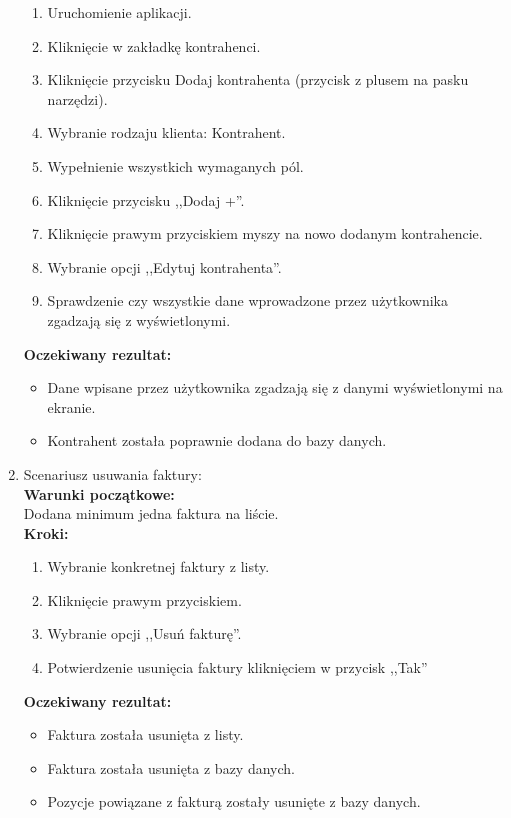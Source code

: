 \begin{enumerate}
        \begin{enumerate}
            \item Uruchomienie aplikacji.
            \item Kliknięcie w zakładkę kontrahenci.
            \item Kliknięcie przycisku Dodaj kontrahenta (przycisk z plusem na pasku narzędzi).
            \item Wybranie rodzaju klienta: Kontrahent.
            \item Wypełnienie wszystkich wymaganych pól.
            \item Kliknięcie przycisku ,,Dodaj +''.
            \item Kliknięcie prawym przyciskiem myszy na nowo dodanym kontrahencie.
            \item Wybranie opcji ,,Edytuj kontrahenta''.
            \item Sprawdzenie czy wszystkie dane wprowadzone przez użytkownika zgadzają się z wyświetlonymi.
        \end{enumerate}
        \textbf{Oczekiwany rezultat:}
        \begin{itemize}
            \item Dane wpisane przez użytkownika zgadzają się z danymi wyświetlonymi na ekranie.
            \item Kontrahent została poprawnie dodana do bazy danych.
        \end{itemize}
    \item Scenariusz usuwania faktury: \\
        \textbf{Warunki początkowe: } \\
        Dodana minimum jedna faktura na liście.\\
        \textbf{Kroki: }
        \begin{enumerate}
            \item Wybranie konkretnej faktury z listy.
            \item Kliknięcie prawym przyciskiem.
            \item Wybranie opcji ,,Usuń fakturę''.
            \item Potwierdzenie usunięcia faktury kliknięciem w przycisk ,,Tak''
        \end{enumerate}
        \textbf{Oczekiwany rezultat:}
        \begin{itemize}
            \item Faktura została usunięta z listy.
            \item Faktura została usunięta z bazy danych.
            \item Pozycje powiązane z fakturą zostały usunięte z bazy danych.
        \end{itemize}
\end{enumerate}


